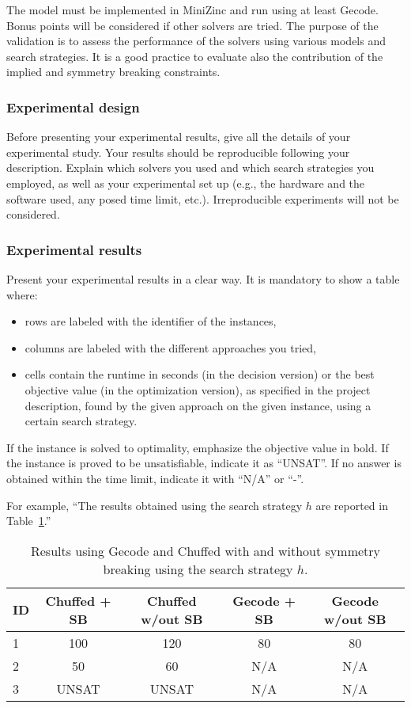 \documentclass{article}
\begin{document}
The model must be implemented in MiniZinc and run using at least Gecode. Bonus points will be considered if other solvers are tried. The purpose of the validation is to assess the performance of the solvers using various models and search strategies. It is a good practice to evaluate also the contribution of the implied and symmetry breaking constraints.

\subsubsection*{Experimental design}

Before presenting your experimental results, give all the details of your experimental study. Your results should be reproducible following your description. Explain which solvers you used and which search strategies you employed, as well as your experimental set up (e.g., the hardware and the software used, any posed time limit, etc.). Irreproducible experiments will not be considered.

\subsubsection*{Experimental results}

Present your experimental results in a clear way. It is mandatory to show a table where:
\begin{itemize}
    \item rows are labeled with the identifier of the instances,
    \item columns are labeled with the different approaches you tried,
    \item cells contain the runtime in seconds (in the decision version) or the best objective value (in the optimization version), as specified in the project description, found by the given approach on the given instance, using a certain search strategy.
\end{itemize}

If the instance is solved to optimality, emphasize the objective value in bold. If the instance is proved to be unsatisfiable, indicate it as ``UNSAT''. If no answer is obtained within the time limit, indicate it with ``N/A'' or ``-''.

For example, ``The results obtained using the search strategy $h$ are reported in Table~\ref{tab:results}.''

\begin{table}[h]
    \centering
    \begin{tabular}{lcccc}
        \toprule
        ID &
        Chuffed + SB &
        Chuffed w/out SB &
        Gecode + SB &
        Gecode w/out SB \\
        \midrule
        1 & 100 & 120 & 80  & 80 \\
        2 & 50  & 60  & N/A & N/A \\
        3 & UNSAT & UNSAT & N/A & N/A \\
        \bottomrule
    \end{tabular}
    \caption{Results using Gecode and Chuffed with and without symmetry breaking using the search strategy $h$.}
    \label{tab:results}
\end{table}
\end{document}

